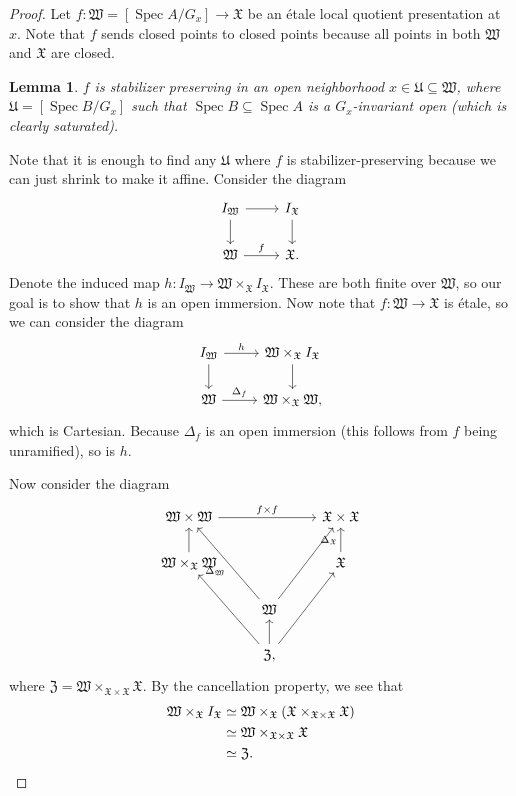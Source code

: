 \documentclass{amsart}
\newtheorem{lem}[thm]{Lemma}
\theoremstyle{definition}
\theoremstyle{remark}
\theoremstyle{plain}
\theoremstyle{definition}
\theoremstyle{remark}
\newcommand{\mf}[1]{\mathfrak{#1}}
\newcommand{\1}{\mathbf{1}}
\newcommand{\2}{\mathbf{2}}
\newcommand{\3}{\mathbf{3}}
\DeclareMathOperator{\Spec}{Spec}
\begin{document}
\begin{proof}
    Let \(f \colon \mf{W} = [\Spec A / G_x] \to \mf{X}\) be an \'etale local quotient presentation at \(x\). Note that \(f\) sends closed points to closed points because all points in both \(\mf{W}\) and \(\mf{X}\) are closed. 

    \begin{lem}
        \(f\) is stabilizer preserving in an open neighborhood \(x \in \mf{U}\subseteq \mf{W}\), where \(\mf{U} = [\Spec B / G_x]\) such that \(\Spec B \subseteq \Spec A\) is a \(G_x\)-invariant open (which is clearly saturated). 
    \end{lem}

    Note that it is enough to find any \(\mf{U}\) where \(f\) is stabilizer-preserving because we can just shrink to make it affine. Consider the diagram
    \begin{equation*}
    \begin{tikzcd}
        I_{\mf{W}} \ar{r} \ar{d} & I_{\mf{X}} \ar{d} \\
        \mf{W} \ar{r}{f} & \mf{X}.
    \end{tikzcd}
    \end{equation*}
    Denote the induced map \(h \colon I_{\mf{W}} \to \mf{W} \times_{\mf{X}} I_{\mf{X}}\). These are both finite over \(\mf{W}\), so our goal is to show that \(h\) is an open immersion. Now note that \(f \colon \mf{W} \to \mf{X}\) is \'etale, so we can consider the diagram
    \begin{equation*}
    \begin{tikzcd}
        I_{\mf{W}} \ar{r}{h} \ar{d} & \mf{W} \times_{\mf{X}} I_{\mf{X}} \ar{d} \\
        \mf{W} \ar{r}{\Delta_f} & \mf{W} \times_{\mf{X}} \mf{W},
    \end{tikzcd}
    \end{equation*}
    which is Cartesian. Because \(\Delta_f\) is an open immersion (this follows from \(f\) being unramified), so is \(h\).

    Now consider the diagram
    \begin{equation*}
    \begin{tikzcd}
        \mf{W} \times \mf{W} \ar{rr}{f \times f} & & \mf{X} \times \mf{X} \\
        \mf{W} \times_{\mf{X}} \mf{W} \ar{u} & & \mf{X} \ar{u}{\Delta_{\mf{X}}} \\
        & \mf{W} \ar{uur} \ar{uul}{\Delta_{\mf{W}}} \\
        & \mf{Z} \ar{u} \ar{uur} \ar{uul},
    \end{tikzcd}
    \end{equation*}
    where \(\mf{Z} = \mf{W} \times_{\mf{X} \times \mf{X}} \mf{X}\). By the cancellation property, we see that
    \begin{align*}
        \mf{W} \times_{\mf{X}} I_{\mf{X}} &\simeq \mf{W} \times_{\mf{X}} (\mf{X} \times_{\mf{X} \times \mf{X}} \mf{X}) \\
        &\simeq \mf{W} \times_{\mf{X} \times \mf{X}} \mf{X} \\
        &\simeq \mf{Z}. \qedhere
    \end{align*}
\end{proof}
\end{document}
